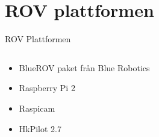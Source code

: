\documentclass[11pt,aspectratio=169]{beamer}
\begin{document}
\section{ROV plattformen}
\begin{frame}{ROV Plattformen}
\begin{columns}
\begin{column}{0.5\textwidth}
\begin{itemize}
\item  {BlueROV paket från Blue Robotics}
\item  {Raspberry Pi 2}
\item  {Raspicam}
\item  {HkPilot 2.7}
\end{itemize}
\end{column}
\begin{column}{0.5\textwidth}


\end{column}
\end{columns}
\end{frame}
\end{document}
